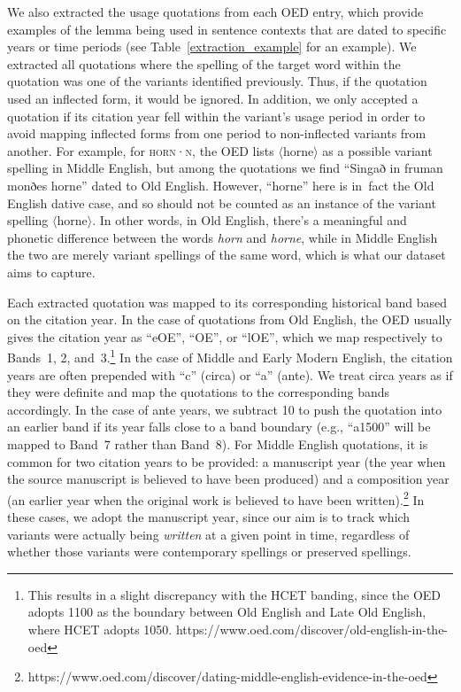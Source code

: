 \documentclass[doc,biblatex]{apa7}
\newcommand\lemma[2]{\textsc{#1·#2}}
\newcommand\spelling[1]{\allowbreak$\langle$#1$\rangle$}
\begin{document}
We also extracted the usage quotations from each OED entry, which provide examples of the lemma being used in sentence contexts that are dated to specific years or time periods (see Table~\ref{extraction_example} for an example). We extracted all quotations where the spelling of the target word within the quotation was one of the variants identified previously. Thus, if the quotation used an inflected form, it would be ignored. In addition, we only accepted a quotation if its citation year fell within the variant's usage period in order to avoid mapping inflected forms from one period to non-inflected variants from another. For example, for \lemma{horn}{n}, the OED lists \spelling{horne} as a possible variant spelling in Middle English, but among the quotations we find ``Singað in fruman monðes horne'' dated to Old English. However, ``horne'' here is in~fact the Old English dative case, and so should not be counted as an instance of the variant spelling \spelling{horne}. In other words, in Old English, there's a meaningful and phonetic difference between the words \textit{horn} and \textit{horne}, while in Middle English the two are merely variant spellings of the same word, which is what our dataset aims to capture.

Each extracted quotation was mapped to its corresponding historical band based on the citation year. In the case of quotations from Old English, the OED usually gives the citation year as ``eOE'', ``OE'', or ``lOE'', which we map respectively to Bands~1, 2, and~3.\footnote{This results in a slight discrepancy with the HCET banding, since the OED adopts 1100 as the boundary between Old English and Late Old English, where HCET adopts 1050. https://www.oed.com/discover/old-english-in-the-oed} In the case of Middle and Early Modern English, the citation years are often prepended with ``c'' (circa) or ``a'' (ante). We treat circa years as if they were definite and map the quotations to the corresponding bands accordingly. In the case of ante years, we subtract 10 to push the quotation into an earlier band if its year falls close to a band boundary (e.g., ``a1500'' will be mapped to Band~7 rather than Band~8). For Middle English quotations, it is common for two citation years to be provided: a manuscript year (the year when the source manuscript is believed to have been produced) and a composition year (an earlier year when the original work is believed to have been written).\footnote{https://www.oed.com/discover/dating-middle-english-evidence-in-the-oed} In these cases, we adopt the manuscript year, since our aim is to track which variants were actually being \textit{written} at a given point in time, regardless of whether those variants were contemporary spellings or preserved spellings.
\end{document}
